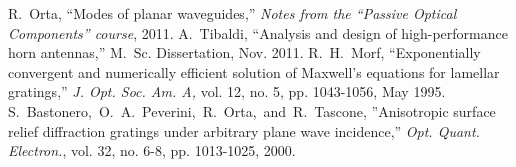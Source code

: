 \documentclass[a4paper,12pt]{article}
\begin{document}
\begin{thebibliography}{99}
 R.~Orta, ``Modes of planar waveguides,'' \textit{Notes from the ``Passive Optical Components'' course}, 2011.
 A.~Tibaldi, ``Analysis and design of high-performance horn antennas,'' M.~Sc. Dissertation, Nov. 2011.
 R.~H.~Morf, ``Exponentially convergent and numerically efficient solution of Maxwell's equations for lamellar gratings,'' \textit{J. Opt. Soc. Am. A,} vol. 12, no. 5, pp. 1043-1056, May 1995.
 S.~Bastonero,~O.~A.~Peverini,~R.~Orta,~and~R.~Tascone, ''Anisotropic surface relief diffraction gratings under arbitrary plane wave incidence,'' \textit{Opt. Quant. Electron.}, vol. 32, no. 6-8, pp. 1013-1025, 2000.
\end{thebibliography}
\end{document}

